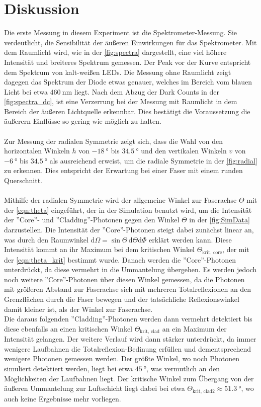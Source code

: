 \section{Diskussion}
\label{sec:Discussion}
Die erste Messung in diesem Experiment ist die Spektrometer-Messung. Sie verdeutlicht, die Sensibilität der äußeren Einwirkungen für das Spektrometer. Mit dem Raumlicht wird, wie in der \autoref{fig:spectra} dargestellt, eine viel höhere Intensität und breiteres Spektrum gemessen. Der Peak vor der Kurve entspricht dem Spektrum von kalt-weißen LEDs. Die Messung ohne Raumlicht zeigt dagegen das Spektrum der Diode etwas genauer, welches im Bereich vom blauen Licht bei etwa $\SI{460}{\nano\meter}$ liegt. Nach dem Abzug der Dark Counts in der \autoref{fig:spectra_dc}, ist eine Verzerrung bei der Messung mit Raumlicht in dem Bereich der äußeren Lichtquelle erkennbar. Dies bestätigt die Voraussetzung die äußerern Einflüsse so gering wie möglich zu halten.\\\\
Zur Messung der radialen Symmetrie zeigt sich, dass die Wahl von den horizontalen Winkeln $h$ von $\SI{-18}{\degree}$ bis $\SI{34.5}{\degree}$ und den vertikalen Winkeln $v$ von $\SI{-6}{\degree}$ bis $\SI{34.5}{\degree}$ als ausreichend erweist, um die radiale Symmetrie in der \autoref{fig:radial} zu erkennen. Dies entspricht der Erwartung bei einer Faser mit einem runden Querschnitt.\\\\
Mithilfe der radialen Symmetrie wird der allgemeine Winkel zur Faserachse $\Theta$ mit der \autoref{eqn:theta} eingeführt, der in der Simulation benutzt wird, um die Intensität der ''Core''- und ''Cladding''-Photonen gegen den Winkel $\Theta$ in der \autoref{fig:SimData} darzustellen. Die Intensität der ''Core''-Photonen steigt dabei zunächst linear an, was durch den Raumwinkel $\text{d}\Omega = \sin{\Theta}\, \text{d}\Theta \text{d}\Phi$ erklärt werden kann. Diese Intensität kommt an ihr Maximum bei dem kritischen Winkel $\Theta_{\text{krit, core}}$, der mit der \autoref{eqn:theta_krit} bestimmt wurde. Danach werden die ''Core''-Photonen unterdrückt, da diese vermehrt in die Ummantelung übergehen. Es werden jedoch noch weitere ''Core''-Photonen über diesen Winkel gemessen, da die Photonen mit größeren Abstand zur Faserachse sich mit mehreren Totalreflexionen an den Grenzflächen durch die Faser bewegen und der tatsächliche Reflexionswinkel damit kleiner ist, als der Winkel zur Faserachse.\\
Die daraus folgenden ''Cladding''-Photonen werden dann vermehrt detektiert bis diese ebenfalls an einen kritischen Winkel $\Theta_{\text{krit, clad}}$ an ein Maximum der Intensität gelangen. Der weitere Verlauf wird dann stärker unterdrückt, da immer wenigere Laufbahnen die Totalreflexion-Bedinung erfüllen und dementsprechend wenigere Photonen gemessen werden. Der größte Winkel, wo noch Photonen simuliert detektiert werden, liegt bei etwa $\SI{45}{\degree}$, was vermutlich an den Möglichkeiten der Laufbahnen liegt. Der kritische Winkel zum Übergang von der äußeren Ummantelung zur Luftschicht liegt dabei bei etwa $\Theta_{\text{krit, clad2}} \approx \SI{51.3}{\degree}$, wo auch keine Ergebnisse mehr vorliegen.\\
